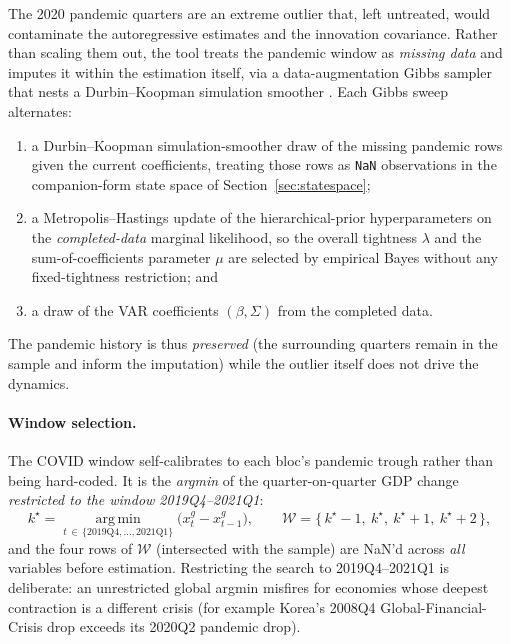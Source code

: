 \documentclass[11pt]{article}
\theoremstyle{definition}
\theoremstyle{remark}
\begin{document}
The 2020 pandemic quarters are an extreme outlier that, left untreated,
would contaminate the autoregressive estimates and the innovation
covariance. Rather than scaling them out, the tool treats the pandemic
window as \emph{missing data} and imputes it within the estimation
itself, via a data-augmentation Gibbs sampler that nests a
Durbin--Koopman simulation smoother \citep{DurbinKoopman2002,
DurbinKoopman2012}. Each Gibbs sweep alternates:
\begin{enumerate}[label=(\roman*)]
  \item a Durbin--Koopman simulation-smoother draw of the missing
    pandemic rows given the current coefficients, treating those rows as
    \texttt{NaN} observations in the companion-form state space of
    Section~\ref{sec:statespace};
  \item a Metropolis--Hastings update of the hierarchical-prior
    hyperparameters on the \emph{completed-data} marginal likelihood, so
    the overall tightness $\lambda$ and the sum-of-coefficients
    parameter $\mu$ \citep{Giannone2015} are selected by empirical Bayes
    without any fixed-tightness restriction; and
  \item a draw of the VAR coefficients $(\beta,\Sigma)$ from the
    completed data.
\end{enumerate}
The pandemic history is thus \emph{preserved} (the surrounding quarters
remain in the sample and inform the imputation) while the outlier itself
does not drive the dynamics.

\paragraph{Window selection.} The COVID window self-calibrates to each
bloc's pandemic trough rather than being hard-coded. It is the
\emph{argmin} of the quarter-on-quarter GDP change \emph{restricted to
the window 2019Q4--2021Q1}:
\begin{equation}\label{eq:covid-window}
  k^\star = \operatorname*{arg\,min}_{t \,\in\,\{\text{2019Q4},\dots,\text{2021Q1}\}}
            \bigl(x^{g}_t - x^{g}_{t-1}\bigr),
  \qquad
  \mathcal{W} = \{\,k^\star-1,\ k^\star,\ k^\star+1,\ k^\star+2\,\},
\end{equation}
and the four rows of $\mathcal{W}$ (intersected with the sample) are
NaN'd across \emph{all} variables before estimation. Restricting the
search to 2019Q4--2021Q1 is deliberate: an unrestricted global argmin
misfires for economies whose deepest contraction is a different crisis
(for example Korea's 2008Q4 Global-Financial-Crisis drop exceeds its
2020Q2 pandemic drop).
\end{document}
